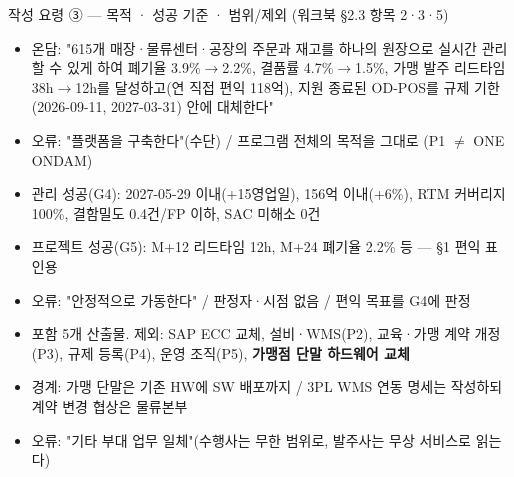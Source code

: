 \begin{frame}[allowframebreaks=1.0]{작성 요령 ③ — 목적 · 성공 기준 · 범위/제외 (워크북 §2.3 항목 2·3·5)}
\small
\par\smallskip{}\nobreak
\begin{itemize}
\item\relax 온담: "615개 매장·물류센터·공장의 주문과 재고를 하나의 원장으로 실시간 관리할 수 있게 하여 폐기율 3.9\%$\rightarrow$2.2\%, 결품률 4.7\%$\rightarrow$1.5\%, 가맹 발주 리드타임 38h$\rightarrow$12h를 달성하고(연 직접 편익 118억), 지원 종료된 OD-POS를 규제 기한(2026-09-11, 2027-03-31) 안에 대체한다"
\item\relax 오류: "플랫폼을 구축한다"(수단) / 프로그램 전체의 목적을 그대로 (P1 $\neq$ ONE ONDAM)
\end{itemize}
\par\smallskip{}\nobreak
\begin{itemize}
\item\relax 관리 성공(G4): 2027-05-29 이내(+15영업일), 156억 이내(+6\%), RTM 커버리지 100\%, 결함밀도 0.4건/FP 이하, SAC 미해소 0건
\item\relax 프로젝트 성공(G5): M+12 리드타임 12h, M+24 폐기율 2.2\% 등 — §1 편익 표 인용
\item\relax 오류: "안정적으로 가동한다" / 판정자·시점 없음 / 편익 목표를 G4에 판정
\end{itemize}
\par\smallskip{}\nobreak
\begin{itemize}
\item\relax 포함 5개 산출물. 제외: SAP ECC 교체, 설비·WMS(P2), 교육·가맹 계약 개정(P3), 규제 등록(P4), 운영 조직(P5), \textbf{가맹점 단말 하드웨어 교체}
\item\relax 경계: 가맹 단말은 기존 HW에 SW 배포까지 / 3PL WMS 연동 명세는 작성하되 계약 변경 협상은 물류본부
\item\relax 오류: "기타 부대 업무 일체"(수행사는 무한 범위로, 발주사는 무상 서비스로 읽는다)
\end{itemize}
\end{frame}

